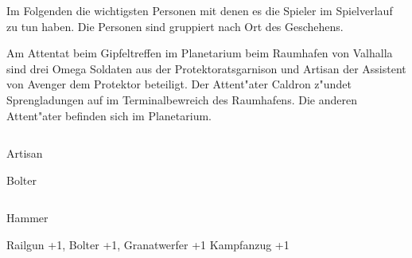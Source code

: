 
Im Folgenden die wichtigsten Personen mit denen es die Spieler im Spielverlauf zu tun haben. Die Personen sind gruppiert
nach Ort des Geschehens.

























Am Attentat beim Gipfeltreffen im Planetarium beim Raumhafen von Valhalla sind drei Omega Soldaten aus der Protektoratsgarnison und Artisan der Assistent von Avenger dem Protektor beteiligt. Der Attent"ater Caldron z"undet Sprengladungen auf im Terminalbewreich des Raumhafens. Die anderen Attent"ater befinden sich im Planetarium.

\begin{column}[l]{0.45}
    \begin{nscsheet}[h]{Artisan}
        \nscstats[ATT=2,AGG=2,DEX=2,COM=3]
        \nscruler
        \begin{nscinventory}
            \nscitem[Waffen] Bolter
        \end{nscinventory}
    \end{nscsheet}
\end{column}
\begin{column}[r]{0.45}
    \begin{nscsheet}[h]{Hammer}
        \nscstats[ATT=2,AGG=3,CON=2]
        \nscruler
        \begin{nscinventory}
            \nscitem[Waffen] Railgun +1, Bolter +1, Granatwerfer +1
            \nscitem[R"ustung] Kampfanzug +1       
        \end{nscinventory}
    \end{nscsheet}
\end{column}
\vfill\pagebreak

